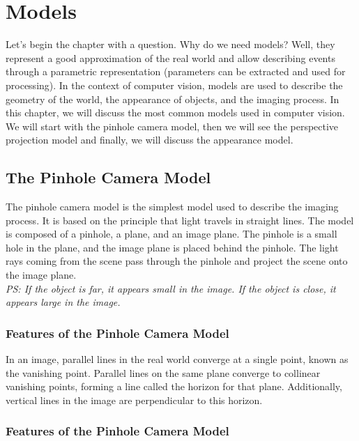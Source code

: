 \chapter{Models}
Let's begin the chapter with a question. Why do we need models?
Well, they represent a good approximation of the real world and allow describing events through a parametric representation (parameters can be extracted and used for processing). In the context of computer vision, models are used to describe the geometry of the world, the appearance of objects, and the imaging process. In this chapter, we will discuss the most common models used in computer vision. We will start with the pinhole camera model, then we will see the perspective projection model and finally, we will discuss the appearance model.
\section{The Pinhole Camera Model}
The pinhole camera model is the simplest model used to describe the imaging process. It is based on the principle that light travels in straight lines. The model is composed of a pinhole, a plane, and an image plane. The pinhole is a small hole in the plane, and the image plane is placed behind the pinhole. The light rays coming from the scene pass through the pinhole and project the scene onto the image plane. 
\\\textit{PS: If the object is far, it appears small in the image. If the object is close, it appears large in the image.}
\subsection{Features of the Pinhole Camera Model}
In an image, parallel lines in the real world converge at a single point, known as the vanishing point. Parallel lines on the same plane converge to collinear vanishing points, forming a line called the horizon for that plane. Additionally, vertical lines in the image are perpendicular to this horizon. 

\subsection{Features of the Pinhole Camera Model}

